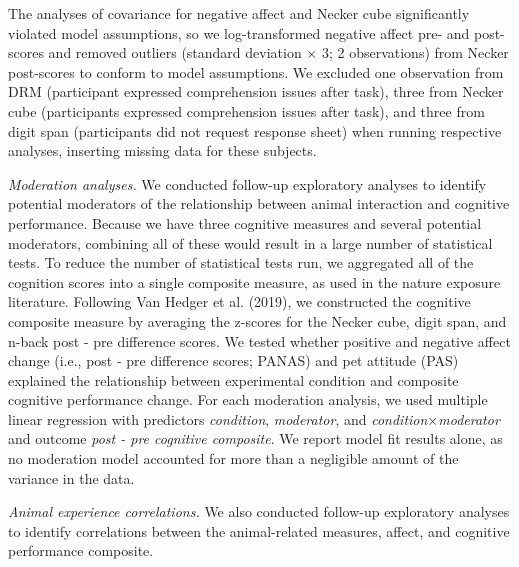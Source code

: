 \documentclass[
  english,
  pub,floatsintext]{apa6}
\begin{document}
The analyses of covariance for negative affect and Necker cube significantly violated model assumptions, so we log-transformed negative affect pre- and post-scores and removed outliers (standard deviation \(\times\) 3; 2 observations) from Necker post-scores to conform to model assumptions. We excluded one observation from DRM (participant expressed comprehension issues after task), three from Necker cube (participants expressed comprehension issues after task), and three from digit span (participants did not request response sheet) when running respective analyses, inserting missing data for these subjects.

\emph{Moderation analyses.}
We conducted follow-up exploratory analyses to identify potential moderators of the relationship between animal interaction and cognitive performance. Because we have three cognitive measures and several potential moderators, combining all of these would result in a large number of statistical tests. To reduce the number of statistical tests run, we aggregated all of the cognition scores into a single composite measure, as used in the nature exposure literature. Following Van Hedger et al. (2019), we constructed the cognitive composite measure by averaging the z-scores for the Necker cube, digit span, and n-back post - pre difference scores. We tested whether positive and negative affect change (i.e., post - pre difference scores; PANAS) and pet attitude (PAS) explained the relationship between experimental condition and composite cognitive performance change. For each moderation analysis, we used multiple linear regression with predictors \emph{condition}, \emph{moderator}, and \emph{condition}\(\times\)\emph{moderator} and outcome \emph{post - pre cognitive composite}. We report model fit results alone, as no moderation model accounted for more than a negligible amount of the variance in the data.

\emph{Animal experience correlations.}
We also conducted follow-up exploratory analyses to identify correlations between the animal-related measures, affect, and cognitive performance composite.
\end{document}
